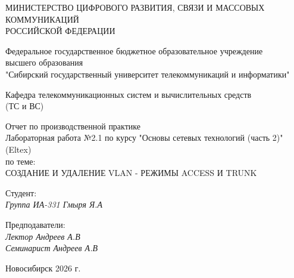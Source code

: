 \thispagestyle{empty}

\begin{center}
    МИНИСТЕРСТВО ЦИФРОВОГО РАЗВИТИЯ, СВЯЗИ И МАССОВЫХ КОММУНИКАЦИЙ \\ РОССИЙСКОЙ ФЕДЕРАЦИИ

    \vspace{20pt}

    Федеральное государственное бюджетное образовательное учреждение  \\  высшего образования \\
    "Сибирский государственный университет телекоммуникаций и информатики" \\

    \vspace{20pt}

    Кафедра телекоммуникационных систем и вычислительных средств \\  (ТС и ВС)
\end{center}

\vfill

\begin{center}
    Отчет по производственной практике \\  
    Лабораторная работа №2.1 по курсу "Основы сетевых технологий (часть 2)" (Eltex) \\
    \vspace{20pt}
    по теме: \\
    \uppercase{Создание и удаление VLAN - режимы access и trunk}
\end{center}

\vfill

    \noindent Студент: \\
    \textit{Группа ИА-331 \hfill Гмыря Я.А} 

    \vspace{20pt}
 
    \noindent Предподаватели: \\
    \textit{Лектор \hfill Андреев А.В} \\
    \textit{Семинарист \hfill Андреев А.В}

\vfill

\begin{center}
    Новосибирск 2026 г.
\end{center}